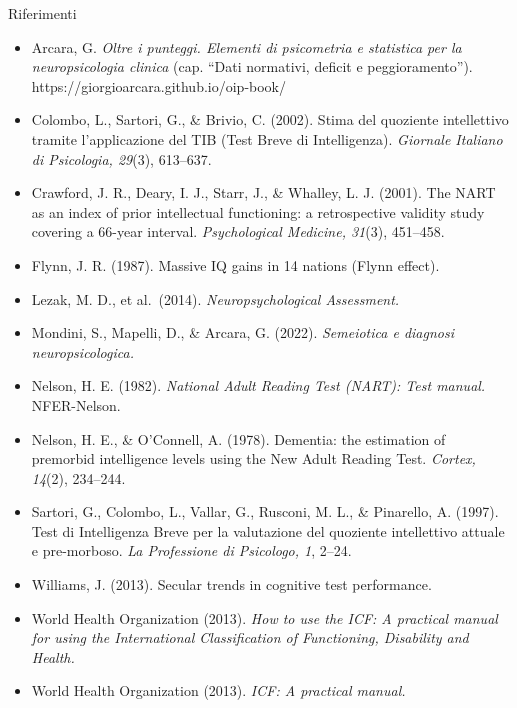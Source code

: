 \documentclass[
  ignorenonframetext,
  aspectratio=169,
]{beamer}
\providecommand{\tightlist}{%
  \setlength{\itemsep}{0pt}\setlength{\parskip}{0pt}}
\begin{document}
\begin{frame}{Riferimenti}
\label{riferimenti-1}
\footnotesize

\begin{itemize}
\tightlist
\item
  Arcara, G. \emph{Oltre i punteggi. Elementi di psicometria e
  statistica per la neuropsicologia clinica} (cap. ``Dati normativi,
  deficit e peggioramento''). https://giorgioarcara.github.io/oip-book/
\item
  Colombo, L., Sartori, G., \& Brivio, C. (2002). Stima del quoziente
  intellettivo tramite l'applicazione del TIB (Test Breve di
  Intelligenza). \emph{Giornale Italiano di Psicologia, 29}(3),
  613--637.
\item
  Crawford, J. R., Deary, I. J., Starr, J., \& Whalley, L. J. (2001).
  The NART as an index of prior intellectual functioning: a
  retrospective validity study covering a 66-year interval.
  \emph{Psychological Medicine, 31}(3), 451--458.
\item
  Flynn, J. R. (1987). Massive IQ gains in 14 nations (Flynn effect).
\item
  Lezak, M. D., et al.~(2014). \emph{Neuropsychological Assessment.}
\item
  Mondini, S., Mapelli, D., \& Arcara, G. (2022). \emph{Semeiotica e
  diagnosi neuropsicologica.}
\item
  Nelson, H. E. (1982). \emph{National Adult Reading Test (NART): Test
  manual.} NFER-Nelson.
\item
  Nelson, H. E., \& O'Connell, A. (1978). Dementia: the estimation of
  premorbid intelligence levels using the New Adult Reading Test.
  \emph{Cortex, 14}(2), 234--244.
\item
  Sartori, G., Colombo, L., Vallar, G., Rusconi, M. L., \& Pinarello, A.
  (1997). Test di Intelligenza Breve per la valutazione del quoziente
  intellettivo attuale e pre-morboso. \emph{La Professione di Psicologo,
  1}, 2--24.
\item
  Williams, J. (2013). Secular trends in cognitive test performance.
\item
  World Health Organization (2013). \emph{How to use the ICF: A
  practical manual for using the International Classification of
  Functioning, Disability and Health.}
\item
  World Health Organization (2013). \emph{ICF: A practical manual.}
\end{itemize}
\end{frame}
\end{document}
